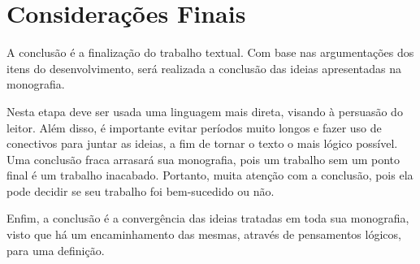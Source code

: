 
\chapter{Considerações Finais}

A conclusão é a finalização do trabalho textual. Com base nas argumentações dos itens do desenvolvimento, será realizada a conclusão das ideias apresentadas na monografia.

Nesta etapa deve ser usada uma linguagem mais direta, visando à persuasão do leitor. Além disso, é importante evitar períodos muito longos e fazer uso de conectivos para juntar as ideias, a fim de tornar o texto o mais lógico possível. Uma conclusão fraca arrasará sua monografia, pois um trabalho sem um ponto final é um trabalho inacabado. Portanto, muita atenção com a conclusão, pois ela pode decidir se seu trabalho foi bem-sucedido ou não.

Enfim, a conclusão é a convergência das ideias tratadas em toda sua monografia, visto que há um encaminhamento das mesmas, 
através de pensamentos lógicos, para uma definição.
